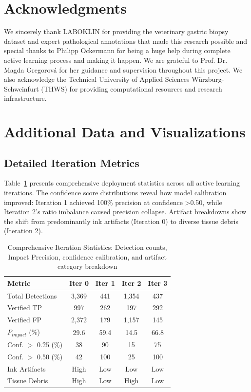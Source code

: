 \documentclass[sigconf, review, nonacm]{acmart}
\begin{document}
\appendix

\section{Acknowledgments}
We sincerely thank LABOKLIN for providing the veterinary gastric biopsy dataset and expert pathological annotations that made this research possible and special thanks to Philipp Ockermann for being a huge help during complete active learning process and making it happen. We are grateful to Prof. Dr. Magda Gregorová for her guidance and supervision throughout this project. We also acknowledge the Technical University of Applied Sciences Würzburg-Schweinfurt (THWS) for providing computational resources and research infrastructure.

\section{Additional Data and Visualizations}

\subsection{Detailed Iteration Metrics}
\label{sec:detailed_metrics}

Table~\ref{tab:detailed_metrics} presents comprehensive deployment statistics across all active learning iterations. The confidence score distributions reveal how model calibration improved: Iteration 1 achieved 100\% precision at confidence >0.50, while Iteration 2's ratio imbalance caused precision collapse. Artifact breakdowns show the shift from predominantly ink artifacts (Iteration 0) to diverse tissue debris (Iteration 2).

\begin{table}[!htb]
\centering
\caption{Comprehensive Iteration Statistics: Detection counts, Impact Precision, confidence calibration, and artifact category breakdown}
\label{tab:detailed_metrics}
\small
\begin{tabular}{lcccc}
\toprule
\textbf{Metric} & \textbf{Iter 0} & \textbf{Iter 1} & \textbf{Iter 2} & \textbf{Iter 3}\\
\midrule
Total Detections & 3,369 & 441 & 1,354 & 437\\
Verified TP & 997 & 262 & 197 & 292\\
Verified FP & 2,372 & 179 & 1,157 & 145\\
$P_{impact}$ (\%) & 29.6 & 59.4 & 14.5 & 66.8\\
\midrule
Conf. $>$ 0.25 (\%) & 38 & 90 & 15 & 75\\
Conf. $>$ 0.50 (\%) & 42 & 100 & 25 & 100\\
\midrule
Ink Artifacts & High & Low & Low & Low\\
Tissue Debris & High & Low & High & Low \\
\bottomrule
\end{tabular}
\end{table}
\end{document}

